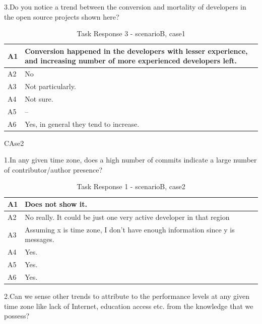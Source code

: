 \documentclass[seploa]{beavtex}
\begin{document}
\begin{appendices}
3.Do you notice a trend between the conversion and mortality of developers in the open source projects shown here?

\begin{table}[H]
\begin{tabular}{ |p{2cm}|p{12cm}| }
 \hline
 A1 & Conversion happened in the developers with lesser experience, and increasing number of more experienced developers left.\\
 \hline
 A2 & No\\ \hline
 A3 & Not particularly.\\ \hline
 A4 & Not sure.\\ \hline
 A5 & --\\ \hline
 A6 & Yes, in general they tend to increase.\\
 \hline
\end{tabular}
\caption{Task Response 3 - scenarioB, case1}
\label{tab:table23}
\end{table}

CAse2

1.In any given time zone, does a high number of commits indicate a large number of contributor/author presence?	

\begin{table}[H]
\begin{tabular}{ |p{2cm}|p{12cm}| }
 \hline
 A1 & Does not show it.\\
 \hline
 A2 & No really. It could be just one very active developer in that region\\ \hline
 A3 & Assuming x is time zone, I don't have enough information since y is messages.\\ \hline
 A4 & Yes.\\ \hline
 A5 & Yes.\\ \hline
 A6 & Yes.\\
 \hline
\end{tabular}
\caption{Task Response 1 - scenarioB, case2}
\label{tab:table31}
\end{table}

2.Can we sense other trends to attribute to the performance levels at any given time zone like lack of Internet, education access etc. from the knowledge that we possess?	


\end{appendices}
\end{document}
